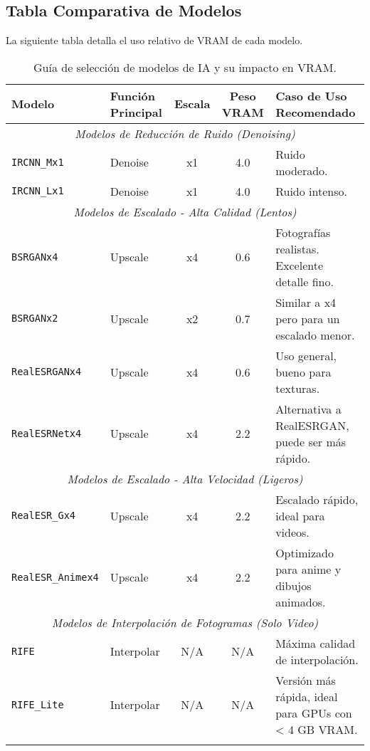 \documentclass[11pt, a4paper]{article}
\begin{document}
\subsection{Tabla Comparativa de Modelos}
La siguiente tabla detalla el uso relativo de VRAM de cada modelo.
\begin{longtable}{l l c c p{6.5cm}}
\toprule
\textbf{Modelo} & \textbf{Función Principal} & \textbf{Escala} & \textbf{Peso VRAM} & \textbf{Caso de Uso Recomendado} \\
\midrule
\endhead %

\multicolumn{5}{c}{\textit{Modelos de Reducción de Ruido (Denoising)}} \\
\midrule
\texttt{IRCNN\_Mx1} & Denoise & x1 & 4.0 & Ruido moderado. \\
\texttt{IRCNN\_Lx1} & Denoise & x1 & 4.0 & Ruido intenso. \\
\midrule
\multicolumn{5}{c}{\textit{Modelos de Escalado - Alta Calidad (Lentos)}} \\
\midrule
\texttt{BSRGANx4} & Upscale & x4 & 0.6 & Fotografías realistas. Excelente detalle fino. \\
\texttt{BSRGANx2} & Upscale & x2 & 0.7 & Similar a x4 pero para un escalado menor. \\
\texttt{RealESRGANx4} & Upscale & x4 & 0.6 & Uso general, bueno para texturas. \\
\texttt{RealESRNetx4} & Upscale & x4 & 2.2 & Alternativa a RealESRGAN, puede ser más rápido. \\
\midrule
\multicolumn{5}{c}{\textit{Modelos de Escalado - Alta Velocidad (Ligeros)}} \\
\midrule
\texttt{RealESR\_Gx4} & Upscale & x4 & 2.2 & Escalado rápido, ideal para videos. \\
\texttt{RealESR\_Animex4} & Upscale & x4 & 2.2 & Optimizado para anime y dibujos animados. \\
\midrule
\multicolumn{5}{c}{\textit{Modelos de Interpolación de Fotogramas (Solo Video)}} \\
\midrule
\texttt{RIFE} & Interpolar & N/A & N/A & Máxima calidad de interpolación. \\
\texttt{RIFE\_Lite} & Interpolar & N/A & N/A & Versión más rápida, ideal para GPUs con < 4 GB VRAM. \\
\bottomrule
\caption{Guía de selección de modelos de IA y su impacto en VRAM.}
\label{tab:modelos} %
\end{longtable}
\end{document}
